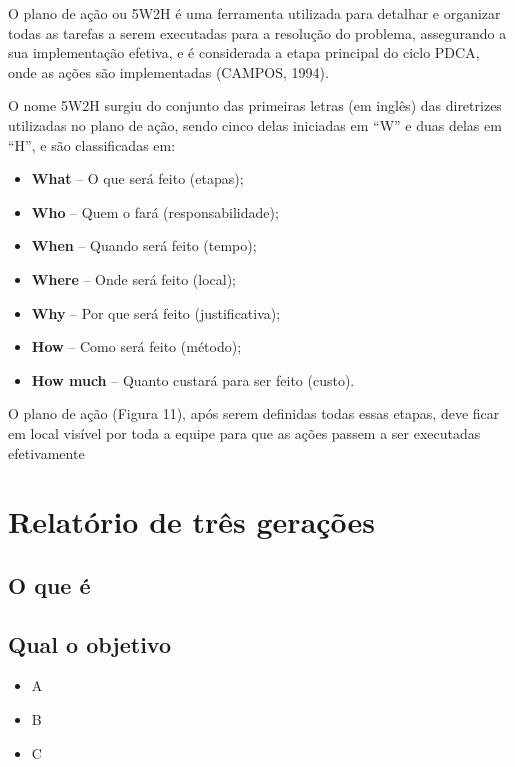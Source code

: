 \documentclass[
]{article}
\providecommand{\tightlist}{%
  \setlength{\itemsep}{0pt}\setlength{\parskip}{0pt}}
\begin{document}
O plano de ação ou 5W2H é uma ferramenta utilizada para detalhar e organizar todas as tarefas a serem executadas para a resolução do problema, assegurando a sua implementação efetiva, e é considerada a etapa principal do ciclo PDCA, onde as ações são implementadas (CAMPOS, 1994).

O nome 5W2H surgiu do conjunto das primeiras letras (em inglês) das diretrizes utilizadas no plano de ação, sendo cinco delas iniciadas em ``W'' e duas delas em ``H'', e são classificadas em:

\begin{itemize}
\tightlist
\item
  \textbf{What} -- O que será feito (etapas);
\item
  \textbf{Who} -- Quem o fará (responsabilidade);
\item
  \textbf{When} -- Quando será feito (tempo);
\item
  \textbf{Where} -- Onde será feito (local);
\item
  \textbf{Why} -- Por que será feito (justificativa);
\item
  \textbf{How} -- Como será feito (método);
\item
  \textbf{How much} -- Quanto custará para ser feito (custo).
\end{itemize}

O plano de ação (Figura 11), após serem definidas todas essas etapas, deve ficar em local visível por toda a equipe para que as ações passem a ser executadas efetivamente

\hypertarget{relatuxf3rio-de-truxeas-gerauxe7uxf5es}{%
\section{Relatório de três gerações}\label{relatuxf3rio-de-truxeas-gerauxe7uxf5es}}

\hypertarget{o-que-uxe9-8}{%
\subsection*{O que é}\label{o-que-uxe9-8}}

\hypertarget{qual-o-objetivo-8}{%
\subsection*{Qual o objetivo}\label{qual-o-objetivo-8}}

\begin{itemize}
\tightlist
\item
  A
\item
  B
\item
  C
\end{itemize}
\end{document}
